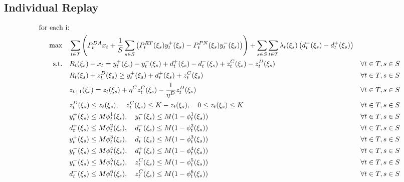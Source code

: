 \documentclass[10pt]{article}
\begin{document}
\subsection{Individual Replay}

\begin{subequations}
    \begin{align} 
        \text{for each i:} \notag\\
        \text{max} \quad &\sum_{t\in T}\left(P_t^{DA} x_{t} + \frac{1}{S}\sum_{s \in S}\left(P_t^{RT}(\xi_s)  y^+_{t}(\xi_s) - P_t^{PN}(\xi_s) y^-_{t}(\xi_s)\right) \right)+ \sum_{s \in S} \sum_{t \in T} \lambda_{t}(\xi_s) \left( d^-_{t}(\xi_s) - d^+_{t}(\xi_s) \right)& \\
        \text{s.t.} \quad 
        & R_{t}(\xi_s) - x_{t} = y_{t}^{+}(\xi_s) - y_{t}^{-}(\xi_s) + d^+_{t}(\xi_s) - d^-_{t}(\xi_s) + z^C_{t}(\xi_s) - z^D_{t}(\xi_s) & \forall t \in T, s \in S\\
        & R_{t}(\xi_s) + z^D_{t}(\xi_s) \geq y^+_{t}(\xi_s) + d^+_{t}(\xi_s) + z^C_{t}(\xi_s) & \forall t \in T, s \in S\\
        & z_{t+1}(\xi_s) = z_{t}(\xi_s) + \eta^C z^C_{t}(\xi_s) - \frac{1}{\eta^D} z^D_{t}(\xi_s) & \forall t \in T, s \in S \\
        & z^D_{t}(\xi_s) \le z_{t}(\xi_s), \quad z^C_{t}(\xi_s) \le K - z_{t}(\xi_s), \quad 0 \leq z_{t}(\xi_s) \leq K & \forall t \in T, s \in S\\
        & y^+_{t}(\xi_s) \leq M \phi^1_{t}(\xi_s), \quad y^-_{t}(\xi_s) \leq M (1 - \phi^1_{t}(\xi_s)) & \forall t \in T, s \in S \\
        & d^+_{t}(\xi_s) \leq M \phi^2_{t}(\xi_s), \quad d^-_{t}(\xi_s) \leq M (1 - \phi^2_{t}(\xi_s)) & \forall t \in T, s \in S \\
        & y^+_{t}(\xi_s) \leq M \phi^3_{t}(\xi_s), \quad d^-_{t}(\xi_s) \leq M (1 - \phi^3_{t}(\xi_s)) & \forall t \in T, s \in S \\
        & y^-_{t}(\xi_s) \leq M \phi^4_{t}(\xi_s), \quad d^+_{t}(\xi_s) \leq M (1 - \phi^4_{t}(\xi_s)) & \forall t \in T, s \in S \\
        & y^-_{t}(\xi_s) \leq M \phi^5_{t}(\xi_s), \quad z^C_{t}(\xi_s) \leq M (1 - \phi^5_{t}(\xi_s)) & \forall t \in T, s \in S \\
        & d^-_{t}(\xi_s) \leq M \phi^6_{t}(\xi_s), \quad z^C_{t}(\xi_s) \leq M (1 - \phi^6_{t}(\xi_s)) & \forall t \in T, s \in S 
    \end{align}
\end{subequations}
\end{document}
